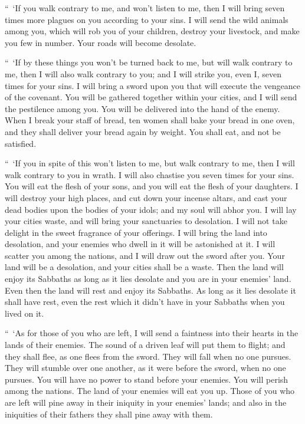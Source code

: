 \myverse{}“ ‘If you walk contrary to me, and won’t listen to me, then I
will bring seven times more plagues on you according to your sins.
\myverse{}I will send the wild animals among you, which will rob you of your children,
destroy your livestock, and make you few in number. Your roads will become desolate.


\myverse{}“ ‘If by these things you won’t be turned back to me, but will
walk contrary to me,
\myverse{}then I will also walk contrary to you; and I will strike you, even I, seven
times for your sins.
\myverse{}I will bring a sword upon you that will execute the vengeance of the covenant.
You will be gathered together within your cities, and I will send the pestilence among you. You will be
delivered into the hand of the enemy.
\myverse{}When I break your staff of bread, ten women shall bake your bread in one
oven, and they shall deliver your bread again by weight. You shall eat, and not be satisfied.


\myverse{}“ ‘If you in spite of this won’t listen to me, but walk contrary
to me,
\myverse{}then I will walk contrary to you in wrath. I will also chastise you seven
times for your sins.
\myverse{}You will eat the flesh of your sons, and you will eat the flesh of your daughters.
\myverse{}I will destroy your high places, and cut down your incense altars, and cast
your dead bodies upon the bodies of your idols; and my soul will abhor you.
\myverse{}I will lay your cities waste, and will bring your sanctuaries to desolation.
I will not take delight in the sweet fragrance of your offerings.
\myverse{}I will bring the land into desolation, and your enemies who dwell in it will
be astonished at it.
\myverse{}I will scatter you among the nations, and I will draw out the sword after
you. Your land will be a desolation, and your cities shall be a waste.
\myverse{}Then the land will enjoy its Sabbaths as long as it lies desolate and you
are in your enemies’ land. Even then the land will rest and enjoy its Sabbaths.
\myverse{}As long as it lies desolate it shall have rest, even the rest which it didn’t
have in your Sabbaths when you lived on it.


\myverse{}“ ‘As for those of you who are left, I will send a faintness
into their hearts in the lands of their enemies. The sound of a driven leaf will put them to flight; and
they shall flee, as one flees from the sword. They will fall when no one pursues.
\myverse{}They will stumble over one another, as it were before the sword, when no
one pursues. You will have no power to stand before your enemies.
\myverse{}You will perish among the nations. The land of your enemies will eat you
up.
\myverse{}Those of you who are left will pine away in their iniquity in your enemies’
lands; and also in the iniquities of their fathers they shall pine away with them.


